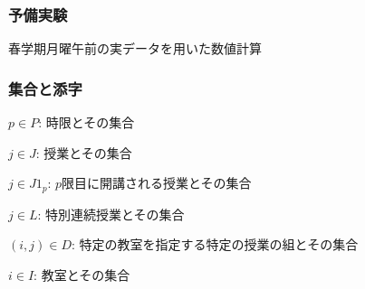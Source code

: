 \documentclass[dvipdfmx,12pt]{beamer}
\begin{document}
\appendix





\begin{frame}
 \frametitle{\LARGE 予備実験}
\begin{center}
\large{春学期月曜午前の実データを用いた数値計算}\\
\end{center}
\begin{table}[htbp]
\begin{center}
\caption{得られた実行可能解の時間推移}
\end{center}
\end{table}
\end{frame}


\begin{frame}
 \frametitle {\LARGE 集合と添字}

\begin{itemize}
{\large
\item $p \in P$: 時限とその集合
\item $j \in J$: 授業とその集合
\item $j \in J1_p$: $p$限目に開講される授業とその集合
\item $j \in L$: 特別連続授業とその集合
\item $(i,j) \in D$: 特定の教室を指定する特定の授業の組とその集合
\item $i \in I$: 教室とその集合
}
\end{itemize}
\end{frame}
\end{document}
